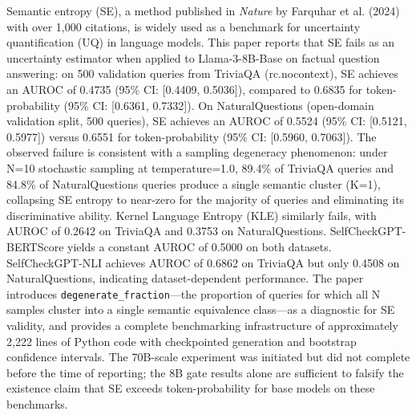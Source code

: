 
Semantic entropy (SE), a method published in \textit{Nature} by Farquhar et al. (2024) with over 1,000 citations, is widely used as a benchmark for uncertainty quantification (UQ) in language models. This paper reports that SE fails as an uncertainty estimator when applied to Llama-3-8B-Base on factual question answering: on 500 validation queries from TriviaQA (rc.nocontext), SE achieves an AUROC of 0.4735 (95\% CI: [0.4409, 0.5036]), compared to 0.6835 for token-probability (95\% CI: [0.6361, 0.7332]). On NaturalQuestions (open-domain validation split, 500 queries), SE achieves an AUROC of 0.5524 (95\% CI: [0.5121, 0.5977]) versus 0.6551 for token-probability (95\% CI: [0.5960, 0.7063]). The observed failure is consistent with a sampling degeneracy phenomenon: under N=10 stochastic sampling at temperature=1.0, 89.4\% of TriviaQA queries and 84.8\% of NaturalQuestions queries produce a single semantic cluster (K=1), collapsing SE entropy to near-zero for the majority of queries and eliminating its discriminative ability. Kernel Language Entropy (KLE) similarly fails, with AUROC of 0.2642 on TriviaQA and 0.3753 on NaturalQuestions. SelfCheckGPT-BERTScore yields a constant AUROC of 0.5000 on both datasets. SelfCheckGPT-NLI achieves AUROC of 0.6862 on TriviaQA but only 0.4508 on NaturalQuestions, indicating dataset-dependent performance. The paper introduces \texttt{degenerate_fraction}—the proportion of queries for which all N samples cluster into a single semantic equivalence class—as a diagnostic for SE validity, and provides a complete benchmarking infrastructure of approximately 2,222 lines of Python code with checkpointed generation and bootstrap confidence intervals. The 70B-scale experiment was initiated but did not complete before the time of reporting; the 8B gate results alone are sufficient to falsify the existence claim that SE exceeds token-probability for base models on these benchmarks.

